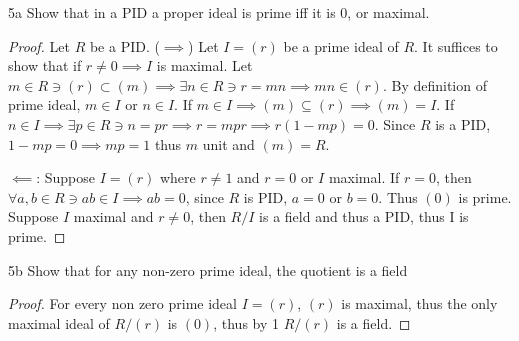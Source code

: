 \documentclass{article}
\begin{document}
\bigskip

\begin{PROB}{5a}\label{Problem 5a.}
    Show that in a PID a proper ideal is prime iff it is 0, or maximal.   
\end{PROB}
\begin{proof}
    Let $R$ be a PID.
    ($\implies$) Let $I = (r)$ be a prime ideal of $R$. It suffices to show that if $r \neq 0 \implies I$ is maximal. Let $m \in R \ni (r) \subset (m) \implies \exists n \in R \ni r = mn \implies mn \in (r)$. By definition of prime ideal, $m \in I$ or $n \in I$. If $m \in I \implies (m) \subseteq (r) \implies (m) = I$. If $n \in I \implies \exists p \in R \ni n = pr \implies r = mpr \implies r(1 - mp) = 0$. Since $R$ is a PID, $1 - mp = 0 \implies mp = 1$ thus $m$ unit and $(m) = R$.
    
    
    $\impliedby$: Suppose $I = (r)$ where $r \neq 1$ and $r = 0$ or $I$ maximal. If $r = 0$, then $\forall a, b \in R \ni ab \in I \implies ab = 0$, since $R$ is PID, $a =0$ or $b = 0$. Thus $(0)$ is prime. Suppose $I$ maximal and $r \neq 0$, then $R / I$ is a field and thus a PID, thus I is prime.               
\end{proof}
\begin{PROB}{5b}\label{Problem 5b.}
    Show that for any non-zero prime ideal, the quotient is a field
\end{PROB}
\begin{proof}
    For every non zero prime ideal $I = (r)$, $(r)$ is maximal, thus the only maximal ideal of $R / (r)$ is $(0)$, thus by 1 $R / (r)$ is a field.     
\end{proof}

\bigskip
\end{document}
